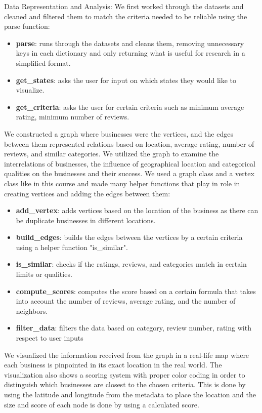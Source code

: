 \documentclass[fontsize=11pt]{article}
\begin{document}
Data Representation and Analysis: We first worked through the datasets and cleaned and filtered them to match the criteria needed to be reliable using the parse function:

\begin{itemize}
    \item \textbf{parse}: runs through the datasets and cleans them, removing unnecessary keys in each dictionary and only returning what is useful for research in a simplified format.
    \item \textbf{get\_states}: asks the user for input on which states they would like to visualize.
    \item \textbf{get\_criteria}: asks the user for certain criteria such as minimum average rating, minimum number of reviews.
\end{itemize}

We constructed a graph where businesses were the vertices, and the edges between them represented relations based on location, average rating, number of reviews, and similar categories. We utilized the graph to examine the interrelations of businesses, the influence of geographical location and categorical qualities on the businesses and their success. We used a graph class and a vertex class like in this course and made many helper functions that play in role in creating vertices and adding the edges between them:

\begin{itemize}
    \item \textbf{add\_vertex}: adds vertices based on the location of the business as there can be duplicate businesses in different locations.
    \item \textbf{build\_edges}: builds the edges between the vertices by a certain criteria using a helper function "is\_similar".
    \item \textbf{is\_similar}: checks if the ratings, reviews, and categories match in certain limits or qualities.
    \item \textbf{compute\_scores}: computes the score based on a certain formula that takes into account the number of reviews, average rating, and the number of neighbors.
    \item \textbf{filter\_data}: filters the data based on category, review number, rating with respect to user inputs
\end{itemize}

We visualized the information received from the graph in a real-life map where each business is pinpointed in its exact location in the real world. The visualization also shows a scoring system with proper color coding in order to distinguish which businesses are closest to the chosen criteria. This is done by using the latitude and longitude from the metadata to place the location and the size and score of each node is done by using a calculated score.
\end{document}
